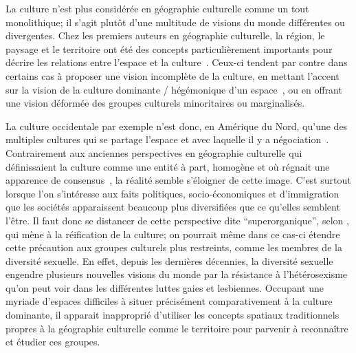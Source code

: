 La culture n'est plus considérée en géographie culturelle comme un tout monolithique; il s'agit plutôt d'une multitude de visions du monde différentes ou divergentes.
Chez les premiers auteurs en géographie culturelle, la région, le paysage et le territoire ont été des concepts particulièrement importants  pour décrire les relations entre l'espace et la culture~\citep{Bonnemaison1981,Monnet1998,DiMeo1998,}.
Ceux-ci tendent par contre dans certains cas à proposer une vision incomplète de la culture, en mettant l'accent sur la vision de la culture dominante / hégémonique d'un espace~\citep[11-12]{Duncan1993}, ou en offrant une vision déformée des groupes culturels minoritaires ou marginalisés.

La culture occidentale par exemple n'est donc, en Amérique du Nord, qu'une des multiples cultures qui se partage l'espace et avec laquelle il y a négociation~\citep[11]{Duncan1993}.
Contrairement aux anciennes perspectives en géographie culturelle qui définissaient la culture comme une entité à part, homogène et où régnait une apparence de consensus~\citep{Duncan1980}, la réalité semble s'éloigner de cette image.
C'est surtout lorsque l'on s'intéresse aux faits politiques, socio-économiques et d'immigration que les sociétés apparaissent beaucoup plus diversifiées que ce qu'elles semblent l'être.
Il faut donc se distancer de cette perspective dite \enquote{superorganique}, selon \citet[198]{Duncan1980}, qui mène à la réification de la culture; on pourrait même dans ce cas-ci étendre cette précaution aux groupes culturels plus restreints, comme les membres de la diversité sexuelle.
En effet, depuis les dernières décennies, la diversité sexuelle engendre plusieurs nouvelles visions du monde par la résistance à l'hétérosexisme qu'on peut voir dans les différentes luttes gaies et lesbiennes.
Occupant une myriade d'espaces difficiles à situer précisément comparativement à la culture dominante, il apparait inapproprié d'utiliser les concepts spatiaux traditionnels propres à la géographie culturelle comme le territoire pour parvenir à reconnaître et étudier ces groupes.

